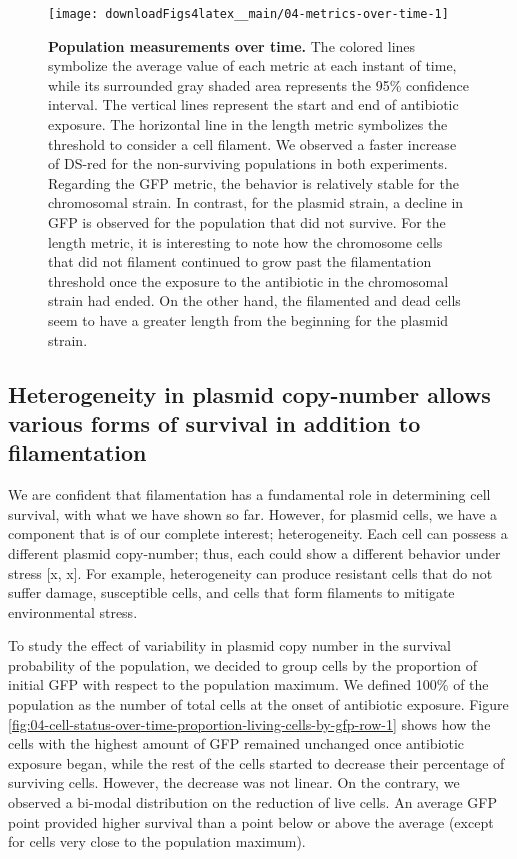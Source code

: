 \documentclass[a4paper, nobind]{templates/ociamthesis}
\begin{document}
\begin{figure}[H]
\texttt{[image: downloadFigs4latex\_\_main/04-metrics-over-time-1]} \caption[Population measurements over time.]{\textbf{Population measurements over time.} The colored lines symbolize the average value of each metric at each instant of time, while its surrounded gray shaded area represents the 95\% confidence interval. The vertical lines represent the start and end of antibiotic exposure. The horizontal line in the length metric symbolizes the threshold to consider a cell filament. We observed a faster increase of DS-red for the non-surviving populations in both experiments. Regarding the GFP metric, the behavior is relatively stable for the chromosomal strain. In contrast, for the plasmid strain, a decline in GFP is observed for the population that did not survive. For the length metric, it is interesting to note how the chromosome cells that did not filament continued to grow past the filamentation threshold once the exposure to the antibiotic in the chromosomal strain had ended. On the other hand, the filamented and dead cells seem to have a greater length from the beginning for the plasmid strain.}\label{fig:04-metrics-over-time-1}
\end{figure}

\hypertarget{heterogeneity-in-plasmid-copy-number-allows-various-forms-of-survival-in-addition-to-filamentation}{%
\subsection{Heterogeneity in plasmid copy-number allows various forms of survival in addition to filamentation}\label{heterogeneity-in-plasmid-copy-number-allows-various-forms-of-survival-in-addition-to-filamentation}}

We are confident that filamentation has a fundamental role in determining cell survival, with what we have shown so far.
However, for plasmid cells, we have a component that is of our complete interest; heterogeneity.
Each cell can possess a different plasmid copy-number; thus, each could show a different behavior under stress {[}x, x{]}.
For example, heterogeneity can produce resistant cells that do not suffer damage, susceptible cells, and cells that form filaments to mitigate environmental stress.

To study the effect of variability in plasmid copy number in the survival probability of the population, we decided to group cells by the proportion of initial GFP with respect to the population maximum.
We defined 100\% of the population as the number of total cells at the onset of antibiotic exposure.
Figure \ref{fig:04-cell-status-over-time-proportion-living-cells-by-gfp-row-1} shows how the cells with the highest amount of GFP remained unchanged once antibiotic exposure began, while the rest of the cells started to decrease their percentage of surviving cells.
However, the decrease was not linear.
On the contrary, we observed a bi-modal distribution on the reduction of live cells.
An average GFP point provided higher survival than a point below or above the average (except for cells very close to the population maximum).
\end{document}
